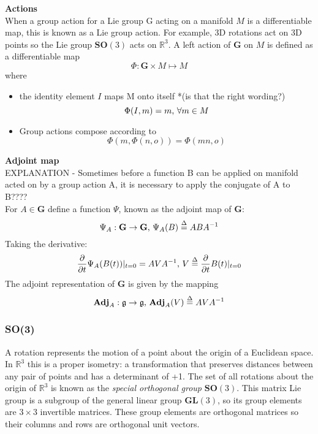 		\textbf{Actions}\\
			When a group action for a Lie group G acting on a manifold $M$ is a differentiable map, this is known as a Lie group action. For example, 3D rotations act on 3D points so the Lie group $\mathbf{SO}(3)$ acts on $\mathbb{R}^3$. A left action of $\mathbf{G}$ on $M$ is defined as a differentiable map
			\begin{equation}
				\Phi: \mathbf{G} \times M \mapsto M
			\end{equation}
			where
			\begin{itemize}
			\item the identity element $I$ maps M onto itself *(is that the right wording?)
				\begin{equation}
					\Phi(I,m) = m \textnormal{, } \forall m \in M
				\end{equation}
			\item Group actions compose according to
				\begin{equation}
					\Phi(m,\Phi(n,o)) = \Phi(mn,o)
				\end{equation}
			\end{itemize}
			
		\textbf{Adjoint map}\\		
		EXPLANATION - Sometimes before a function B can be applied on manifold acted on by a group action A, it is necessary to apply the conjugate of A to B????\\
		For $A \in \mathbf{G}$ define a function $\Psi$, known as the adjoint map of $\mathbf{G}$:
		\begin{equation}
			\Psi_A: \mathbf{G} \rightarrow \mathbf{G} \textnormal{, }
			\Psi_A(B) \stackrel{\Delta}{=} ABA^{-1}
		\end{equation}
		Taking the derivative:
		\begin{equation}
			\frac{\partial}{\partial t} \Psi_A(B(t))|_{t=0} = AVA^{-1} \textnormal{, }
			V \stackrel{\Delta}{=} 	\frac{\partial}{\partial t}B(t)|_{t=0}
		\end{equation}
		The adjoint	representation of $\mathbf{G}$ is given by the mapping
		\begin{equation}
			\textbf{Adj}_A: \mathfrak{g} \rightarrow \mathfrak{g} \textnormal{, }
			\textbf{Adj}_A(V) \stackrel{\Delta}{=} AVA^{-1}
		\end{equation}
	
		
	\subsubsection{\textbf{SO}(3)}	
		A rotation represents the motion of a point about the origin of a Euclidean space. In $\mathbb{R}^3$ this is a proper isometry: a transformation that preserves distances between any pair of points and has a determinant of +1. The set of all rotations about the origin of $\mathbb{R}^3$ is known as the \textit{special orthogonal group} $\textbf{SO}(3)$.
		This matrix Lie group is a subgroup of the general linear group $\textbf{GL}(3)$, so its group elements are $3 \times 3$ invertible matrices. These group elements are orthogonal matrices so their columns and rows are orthogonal unit vectors. 
		
